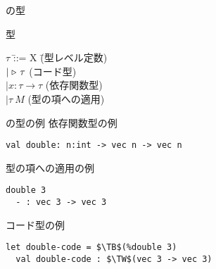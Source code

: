 \documentclass[dvipdfmx,aspectratio=169, 20pt]{beamer}
\begin{document}
\begin{frame}[fragile]{\LMD の型}
    \begin{block}{型}
        \begin{tabbing}
            \hspace{5mm} \( \tau \) \= ::= X \hspace{20mm} \= (型レベル定数) \\
            \> \( \mid {\mathop{\triangleright}}\ \tau \) \> (コード型) \\
            \> \( \mid x:\tau \to \tau \) \> (依存関数型) \\
            \> \( \mid \tau\ M \) \> (型の項への適用)
        \end{tabbing}
    \end{block}
\end{frame}

\begin{frame}[fragile]{\LMD の型の例}
    依存関数型の例
    \begin{exampleblock}{}
        \begin{Verbatim}[commandchars=\\\{\},codes={\catcode`$=3\catcode`^=7}]
  val double: n:int -> vec n -> vec n
        \end{Verbatim}
    \end{exampleblock}
    型の項への適用の例
    \begin{exampleblock}{}
        \begin{Verbatim}[commandchars=\\\{\},codes={\catcode`$=3\catcode`^=7}]
  double 3
  - : vec 3 -> vec 3
        \end{Verbatim}
    \end{exampleblock}
    コード型の例
    \begin{exampleblock}{}
        \begin{Verbatim}[commandchars=\\\{\},codes={\catcode`$=3\catcode`^=7}]
  let double-code = $\TB$(%double 3)
  val double-code : $\TW$(vec 3 -> vec 3)
        \end{Verbatim}
    \end{exampleblock}
\end{frame}
\end{document}
